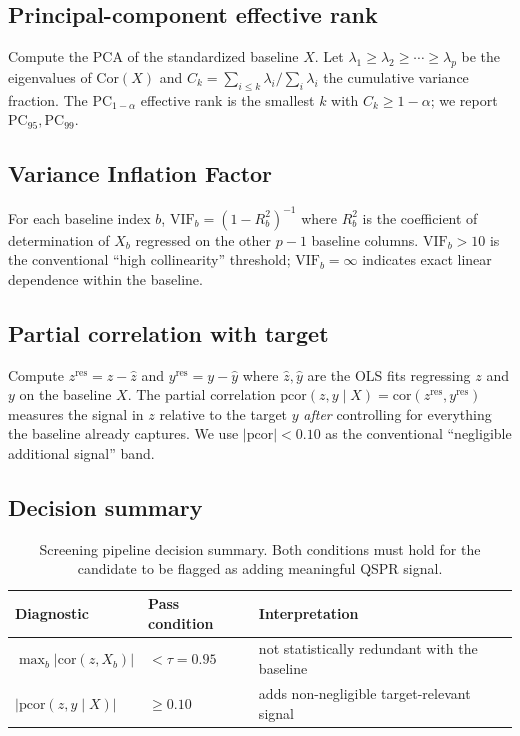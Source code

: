 \documentclass[11pt,a4paper]{article}
\theoremstyle{definition}
\begin{document}
\subsection{Principal-component effective rank}
Compute the PCA of the standardized baseline $X$. Let
$\lambda_1\ge\lambda_2\ge\cdots\ge\lambda_p$ be the eigenvalues of
$\mathrm{Cor}(X)$ and $C_k=\sum_{i\le k}\lambda_i/\sum_i\lambda_i$
the cumulative variance fraction. The
$\mathrm{PC}_{1-\alpha}$ effective rank is the smallest $k$ with
$C_k\ge 1-\alpha$; we report $\mathrm{PC}_{95}, \mathrm{PC}_{99}$.

\subsection{Variance Inflation Factor}
For each baseline index $b$, $\mathrm{VIF}_b=(1-R_b^2)^{-1}$ where
$R_b^2$ is the coefficient of determination of $X_b$ regressed on
the other $p-1$ baseline columns. $\mathrm{VIF}_b>10$ is the
conventional ``high collinearity'' threshold;
$\mathrm{VIF}_b=\infty$ indicates exact linear dependence within
the baseline.

\subsection{Partial correlation with target}
Compute $z^{\mathrm{res}}=z-\hat z$ and $y^{\mathrm{res}}=y-\hat y$
where $\hat z, \hat y$ are the OLS fits regressing $z$ and $y$ on
the baseline $X$. The partial correlation
$\mathrm{pcor}(z,y\mid X)=\mathrm{cor}(z^{\mathrm{res}},y^{\mathrm{res}})$
measures the signal in $z$ relative to the target $y$ \emph{after}
controlling for everything the baseline already captures. We use
$|\mathrm{pcor}|<0.10$ as the conventional ``negligible
additional signal'' band.

\subsection{Decision summary}

\begin{table}[h]
\centering
\caption{Screening pipeline decision summary. Both conditions must hold for the candidate to be flagged as adding meaningful QSPR signal.}
\label{tab:decision}
\begin{tabular}{lll}
\toprule
Diagnostic & Pass condition & Interpretation\\
\midrule
$\max_b|\mathrm{cor}(z,X_b)|$ & $<\tau=0.95$ & not statistically redundant with the baseline\\
$|\mathrm{pcor}(z,y\mid X)|$  & $\ge 0.10$  & adds non-negligible target-relevant signal\\
\bottomrule
\end{tabular}
\end{table}
\end{document}
